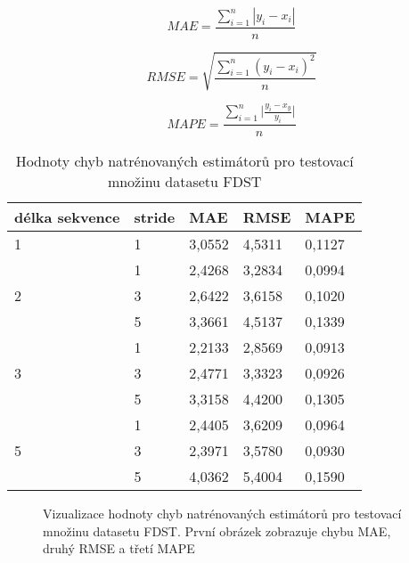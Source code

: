 \begin{equation}
MAE = \frac{\sum_{i=1}^{n} | y_{i} - x_{i} |}{n}
\end{equation}

\begin{equation}
RMSE = \sqrt{\frac{\sum_{i=1}^{n} ( y_{i} - x_{i} )^2}{n}}
\end{equation}

\begin{equation}
MAPE = \frac{\sum_{i=1}^{n} \big| \frac{y_i - x_y}{y_i} \big|}{n}
\end{equation}


\begin{table}[h!]
\centering
\begin{tabular}{|l|l||l|l|l|}
\hline
délka sekvence     & stride & MAE    & RMSE   & MAPE   \\ \hline \hline
1                  & 1      & 3,0552 & 4,5311 & 0,1127 \\ \hline
\multirow{3}{*}{2} & 1      & 2,4268 & 3,2834 & 0,0994 \\ \cline{2-5} 
                   & 3      & 2,6422 & 3,6158 & 0,1020 \\ \cline{2-5} 
                   & 5      & 3,3661 & 4,5137 & 0,1339 \\ \hline
\multirow{3}{*}{3} & 1      & 2,2133 & 2,8569 & 0,0913 \\ \cline{2-5} 
                   & 3      & 2,4771 & 3,3323 & 0,0926 \\ \cline{2-5} 
                   & 5      & 3,3158 & 4,4200 & 0,1305 \\ \hline
\multirow{3}{*}{5} & 1      & 2,4405 & 3,6209 & 0,0964 \\ \cline{2-5} 
                   & 3      & 2,3971 & 3,5780 & 0,0930 \\ \cline{2-5} 
                   & 5      & 4,0362 & 5,4004 & 0,1590 \\ \hline
\end{tabular}
\label{tab:errors}
\caption{Hodnoty chyb natrénovaných estimátorů pro testovací množinu datasetu FDST}
\end{table}


\begin{figure}[h!]
	\centering
	\caption{Vizualizace hodnoty chyb natrénovaných estimátorů pro testovací množinu datasetu FDST. První obrázek zobrazuje chybu MAE, druhý RMSE a třetí MAPE}
	\label{fig:heatmaps}
\end{figure}

